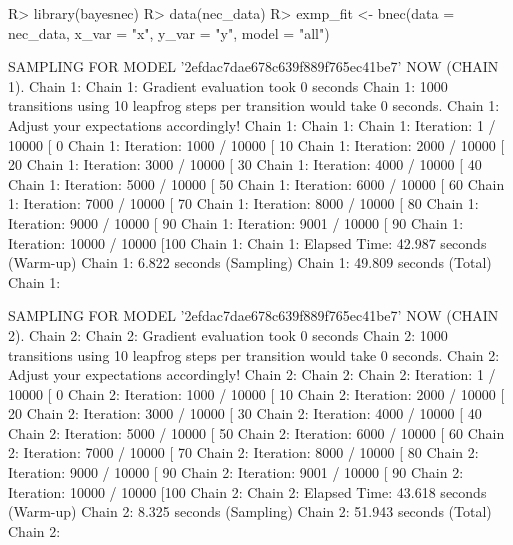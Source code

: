 \documentclass[
]{jss}
\begin{document}
\begin{CodeChunk}
\begin{CodeInput}
R> library(bayesnec)
R> data(nec_data)
R> exmp_fit <- bnec(data = nec_data, x_var = "x", y_var = "y", model = "all")
\end{CodeInput}
\begin{CodeOutput}

SAMPLING FOR MODEL '2efdac7dae678c639f889f765ec41be7' NOW (CHAIN 1).
Chain 1: 
Chain 1: Gradient evaluation took 0 seconds
Chain 1: 1000 transitions using 10 leapfrog steps per transition would take 0 seconds.
Chain 1: Adjust your expectations accordingly!
Chain 1: 
Chain 1: 
Chain 1: Iteration:    1 / 10000 [  0%
Chain 1: Iteration: 1000 / 10000 [ 10%
Chain 1: Iteration: 2000 / 10000 [ 20%
Chain 1: Iteration: 3000 / 10000 [ 30%
Chain 1: Iteration: 4000 / 10000 [ 40%
Chain 1: Iteration: 5000 / 10000 [ 50%
Chain 1: Iteration: 6000 / 10000 [ 60%
Chain 1: Iteration: 7000 / 10000 [ 70%
Chain 1: Iteration: 8000 / 10000 [ 80%
Chain 1: Iteration: 9000 / 10000 [ 90%
Chain 1: Iteration: 9001 / 10000 [ 90%
Chain 1: Iteration: 10000 / 10000 [100%
Chain 1: 
Chain 1:  Elapsed Time: 42.987 seconds (Warm-up)
Chain 1:                6.822 seconds (Sampling)
Chain 1:                49.809 seconds (Total)
Chain 1: 

SAMPLING FOR MODEL '2efdac7dae678c639f889f765ec41be7' NOW (CHAIN 2).
Chain 2: 
Chain 2: Gradient evaluation took 0 seconds
Chain 2: 1000 transitions using 10 leapfrog steps per transition would take 0 seconds.
Chain 2: Adjust your expectations accordingly!
Chain 2: 
Chain 2: 
Chain 2: Iteration:    1 / 10000 [  0%
Chain 2: Iteration: 1000 / 10000 [ 10%
Chain 2: Iteration: 2000 / 10000 [ 20%
Chain 2: Iteration: 3000 / 10000 [ 30%
Chain 2: Iteration: 4000 / 10000 [ 40%
Chain 2: Iteration: 5000 / 10000 [ 50%
Chain 2: Iteration: 6000 / 10000 [ 60%
Chain 2: Iteration: 7000 / 10000 [ 70%
Chain 2: Iteration: 8000 / 10000 [ 80%
Chain 2: Iteration: 9000 / 10000 [ 90%
Chain 2: Iteration: 9001 / 10000 [ 90%
Chain 2: Iteration: 10000 / 10000 [100%
Chain 2: 
Chain 2:  Elapsed Time: 43.618 seconds (Warm-up)
Chain 2:                8.325 seconds (Sampling)
Chain 2:                51.943 seconds (Total)
Chain 2: 


\end{CodeOutput}
\end{CodeChunk}
\end{document}
